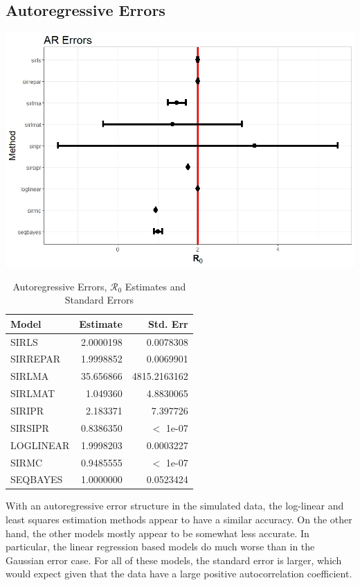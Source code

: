\documentclass[12pt]{article}
\newcommand{\rr}{\ensuremath{\mathcal{R}_0}}
\begin{document}
\subsection{Autoregressive Errors}\label{sec:res-AR}

\includegraphics[scale=0.5]{AR.jpeg}
\begin{table}[H]
	
	\caption{\label{tab:}Autoregressive Errors, $\rr$ Estimates and Standard Errors}
	\centering
	\begin{tabular}[t]{l|r|r}
		\hline
		Model & Estimate & Std. Err\\
		\hline
		SIRLS & 2.0000198 & 0.0078308\\
		\hline
		SIRREPAR & 1.9998852 & 0.0069901 \\
		\hline
		SIRLMA & 35.656866 & 4815.2163162\\
		\hline
		SIRLMAT & 1.049360 & 4.8830065 \\
		\hline
		SIRIPR & 2.183371 & 7.397726 \\
		\hline
		SIRSIPR & 0.8386350 & $<$ 1e-07 \\
		\hline
		LOGLINEAR & 1.9998203 & 0.0003227\\
		\hline
		SIRMC & 0.9485555 & $<$ 1e-07 \\
		\hline
		SEQBAYES & 1.0000000 & 0.0523424\\
		\hline
	\end{tabular}
\end{table}

With an autoregressive error structure in the simulated data, the log-linear and least squares estimation methods appear to have a similar accuracy. On the other hand, the other models mostly appear to be somewhat less accurate. In particular, the linear regression based models do much worse than in the Gaussian error case. For all of these models, the standard error is larger, which would expect given that the data have a large positive autocorrelation coefficient.
\end{document}
